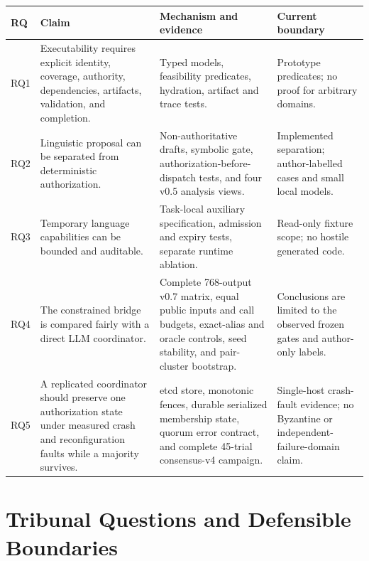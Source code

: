 \begingroup
\setlength{\tabcolsep}{3pt}
\begin{longtable}{>{\raggedright\arraybackslash}p{}>{\raggedright\arraybackslash}p{}>{\raggedright\arraybackslash}p{}>{\raggedright\arraybackslash}p{}}
\toprule
\textbf{RQ} & \textbf{Claim} & \textbf{Mechanism and evidence} & \textbf{Current boundary} \\
\midrule
RQ1 & Executability requires explicit identity, coverage, authority, dependencies, artifacts, validation, and completion. & Typed models, feasibility predicates, hydration, artifact and trace tests. & Prototype predicates; no proof for arbitrary domains. \\
RQ2 & Linguistic proposal can be separated from deterministic authorization. & Non-authoritative drafts, symbolic gate, authorization-before-dispatch tests, and four v0.5 analysis views. & Implemented separation; author-labelled cases and small local models. \\
RQ3 & Temporary language capabilities can be bounded and auditable. & Task-local auxiliary specification, admission and expiry tests, separate runtime ablation. & Read-only fixture scope; no hostile generated code. \\
RQ4 & The constrained bridge is compared fairly with a direct LLM coordinator. & Complete 768-output v0.7 matrix, equal public inputs and call budgets, exact-alias and oracle controls, seed stability, and pair-cluster bootstrap. & Conclusions are limited to the observed frozen gates and author-only labels. \\
RQ5 & A replicated coordinator should preserve one authorization state under measured crash and reconfiguration faults while a majority survives. & etcd store, monotonic fences, durable serialized membership state, quorum error contract, and complete 45-trial consensus-v4 campaign. & Single-host crash-fault evidence; no Byzantine or independent-failure-domain claim. \\
\bottomrule
\end{longtable}
\endgroup

\chapter{Tribunal Questions and Defensible Boundaries}

